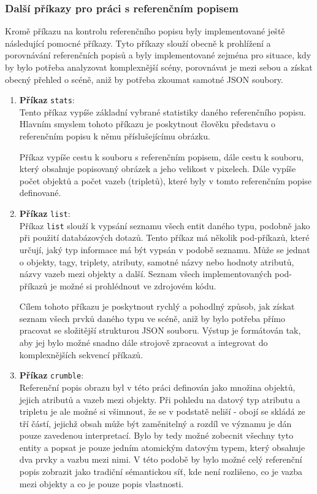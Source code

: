 \subsubsection{Další příkazy pro práci s referenčním popisem}
Kromě příkazu na kontrolu referenčního popisu byly implementované ještě následující pomocné příkazy.
Tyto příkazy slouží obecně k prohlížení a porovnávání referenčních popisů a byly implementované zejména pro situace, kdy by bylo potřeba analyzovat komplexnější scény, porovnávat je mezi sebou a získat obecný přehled o scéně, aniž by potřeba zkoumat samotné JSON soubory.
\begin{enumerate}
	\item \textbf{Příkaz} \texttt{stats}: \\
	      Tento příkaz vypíše základní vybrané statistiky daného referenčního popisu.
	      Hlavním smyslem tohoto příkazu je poskytnout člověku představu o referenčním popisu k němu příslušejícímu obrázku.

	      Příkaz vypíše cestu k souboru s referenčním popisem, dále cestu k souboru,
	      který obsahuje popisovaný obrázek a jeho velikost v pixelech.
	      Dále vypíše počet objektů a počet vazeb (tripletů), které byly v tomto referenčním popise definované.
	\item \textbf{Příkaz} \texttt{list}: \\
	      Příkaz \texttt{list} slouží k vypsání seznamu všech entit daného typu, podobně jako při použití databázových dotazů.
	      Tento příkaz má několik pod-příkazů, které určují, jaký typ informace má být vypsán v podobě seznamu.
	      Může se jednat o objekty, tagy, triplety, atributy, samotné názvy nebo hodnoty atributů,
	      názvy vazeb mezi objekty a další.
	      Seznam všech implementovaných pod-příkazů je možné si prohlédnout ve zdrojovém kódu.

	      Cílem tohoto příkazu je poskytnout rychlý a pohodlný způsob, jak získat seznam všech prvků daného typu ve scéně, aniž by bylo potřeba přímo pracovat se složitější strukturou JSON souboru.
	      Výstup je formátován tak, aby jej bylo možné snadno dále strojově zpracovat a integrovat do komplexnějších sekvencí příkazů.
	\item \textbf{Příkaz} \texttt{crumble}: \\
	      Referenční popis obrazu byl v této práci definován jako množina objektů, jejich atributů a vazeb mezi objekty.
	      Při pohledu na datový typ atributu a tripletu je ale možné si všimnout, že se v podstatě neliší - obojí se skládá ze tří částí,
	      jejichž obsah může být zaměnitelný a rozdíl ve významu je dán pouze zavedenou interpretací.
	      Bylo by tedy možné zobecnit všechny tyto entity a popsat je pouze jedním atomickým datovým typem, který obsahuje dva prvky a vazbu mezi nimi.
	      V této podobě by bylo možné celý referenční popis zobrazit jako tradiční sémantickou síť, kde není rozlišeno, co je vazba mezi objekty a co je pouze popis vlastnosti.


\end{enumerate}
